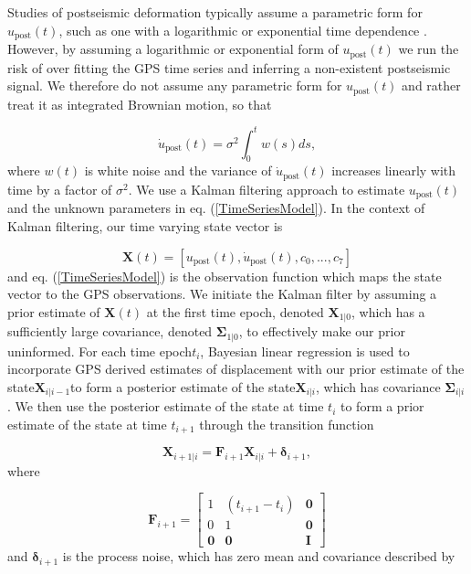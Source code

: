 \documentclass[draft,linenumbers]{AGUJournal}
\providecommand{\DIFadd}[1]{{\protect\color{blue}\uwave{#1}}} %
\providecommand{\DIFaddbegin}{} %
\providecommand{\DIFaddend}{} %
\begin{document}
Studies of postseismic deformation typically assume a parametric form for $u_\mathrm{post}(t)$, such as one with a logarithmic or exponential time dependence \citep[e.g.][]{Savage2005a}.  However, by assuming a logarithmic or exponential form of $u_\mathrm{post}(t)$ we run the risk of over fitting the GPS time series and inferring a non-existent postseismic signal. We therefore do not assume any parametric form for $u_\mathrm{post}(t)$ and rather treat it as integrated Brownian motion, so that 

\begin{equation}
    \dot{u}_\mathrm{post}(t) = \sigma^2\int_0^t w(s) ds,
\end{equation}    
where $w(t)$ is white noise and the variance of $\dot{u}_\mathrm{post}(t)$ increases linearly with time by a factor of $\sigma^2$. We use a Kalman filtering approach to estimate $u_\mathrm{post}(t)$ and the unknown parameters in eq. (\ref{TimeSeriesModel}).  In the context of Kalman filtering, our time varying state vector is

\begin{equation}
    \mathbf{X}(t) = [u_\mathrm{post}(t),\dot u_\mathrm{post}(t), c_0, ..., c_7]
\end{equation}
and eq. (\ref{TimeSeriesModel}) is the observation function which maps the state vector to the GPS observations. We initiate the Kalman filter by assuming a prior estimate of $\mathbf{X}(t)$ at the first time epoch, denoted $\mathbf{X}_{1|0}$, which has a sufficiently large covariance, denoted $\mathbf{\Sigma}_{1|0}$, to effectively make our prior uninformed.  For each time epoch\DIFaddbegin \DIFadd{, }\DIFaddend $t_i$, Bayesian linear regression is used to incorporate GPS derived estimates of displacement with our prior estimate of the state\DIFaddbegin \DIFadd{, }\DIFaddend $\mathbf{X}_{i|i-1}$\DIFaddbegin \DIFadd{, }\DIFaddend to form a posterior estimate of the state\DIFaddbegin \DIFadd{, }\DIFaddend $\mathbf{X}_{i|i}$, which has covariance $\mathbf{\Sigma}_{i|i}$.  We then use the posterior estimate of the state at time $t_i$ to form a prior estimate of the state at time $t_{i+1}$ through the transition function

\begin{equation}\label{predict}
  \mathbf{X}_{i+1|i} = \mathbf{F}_{i+1}\mathbf{X}_{i|i} + \mathbf{\delta}_{i+1}, 
\end{equation}
where 

\begin{equation}
  \mathbf{F}_{i+1} = 
  \left[
  \begin{array}{ccc}
    1           & (t_{i+1} - t_i) & \mathbf{0}\\
    0           & 1              & \mathbf{0}\\
    \mathbf{0}  & \mathbf{0}     & \mathbf{I}
  \end{array}
  \right]
\end{equation}
and $\mathbf{\delta}_{i+1}$ is the process noise, which has zero mean and covariance described by
\end{document}
